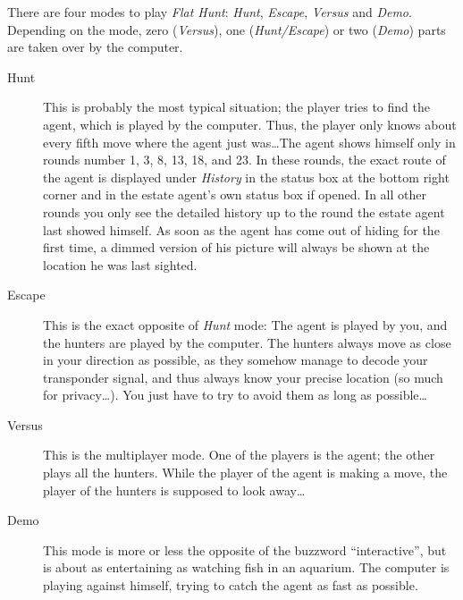 There are four modes to play \emph{Flat Hunt}: \emph{Hunt}, \emph{Escape}, \emph{Versus} and \emph{Demo}. Depending on the mode, zero (\emph{Versus}), one (\emph{Hunt/Escape}) or two (\emph{Demo}) parts are taken over by the computer.

  \begin{description}
    
    \item[Hunt]This is probably the most typical situation; the player tries to find the agent, which is played by the computer. Thus, the player only knows about every fifth move where the agent just was\ldots The agent shows himself only in rounds number 1, 3, 8, 13, 18, and 23. In these rounds, the exact route of the agent is displayed under \emph{History} in the status box at the bottom right corner and in the estate agent's own status box if opened. In all other rounds you only see the detailed history up to the round the estate agent last showed himself. As soon as the agent has come out of hiding for the first time, a dimmed version of his picture will always be shown at the location he was last sighted.

    \item[Escape]This is the exact opposite of \emph{Hunt} mode: The agent is played by you, and the hunters are played by the computer. The hunters always move as close in your direction as possible, as they somehow manage to decode your transponder signal, and thus always know your precise location (so much for privacy\ldots). You just have to try to avoid them as long as possible\ldots
  
    \item[Versus]This is the multiplayer mode. One of the players is the agent; the other plays all the hunters. While the player of the agent is making a move, the player of the hunters is supposed to look away\ldots
   
    \item[Demo]This mode is more or less the opposite of the buzzword ``interactive'', but is about as entertaining as watching fish in an aquarium. The computer is playing against himself, trying to catch the agent as fast as possible.
  
  \end{description}
